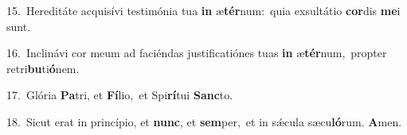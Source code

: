 {\numbfont\textcolor{\numbcolor}{15.}}~Hereditáte acquisívi testimónia tua \textbf{in} æ\-\textbf{tér}\-num:~\star quia exsultátio \textbf{cor}\-dis \textbf{me}\-i sunt.\par
{\numbfont\textcolor{\numbcolor}{16.}}~Inclinávi cor meum ad faciéndas justificatiónes tuas \textbf{in} æ\-\textbf{tér}\-num,~\star propter retri\-\textbf{bu}\-ti\-\textbf{ó}\-nem.\par
{\numbfont\textcolor{\numbcolor}{17.}}~Glória \textbf{Pa}\-tri, et \textbf{Fí}\-lio,~\star et Spi\-\textbf{rí}\-tui \textbf{Sanc}\-to.\par
{\numbfont\textcolor{\numbcolor}{18.}}~Sicut erat in princípio, et \textbf{nunc}\-, et \textbf{sem}\-per,~\star et in sǽcula sæcu\-\textbf{ló}\-rum. \textbf{A}\-men.\par
